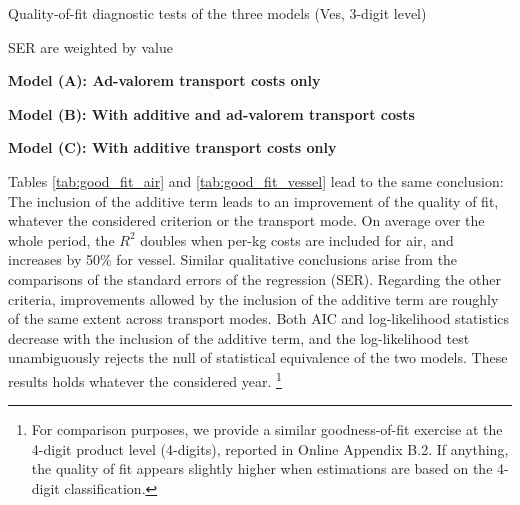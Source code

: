 \documentclass[a4paper,11pt]{article}
\begin{document}
\begin{table}[htbp]
	\centering
	\footnotesize{
		\caption{Quality-of-fit diagnostic tests of the three models (Ves, 3-digit level)}\vspace{5mm}
		\label{tab:good_fit_vessel}%
		
		\begin{tablenotes}
			\tiny
			\item SER are weighted by value
			\item \textbf{Model (A): Ad-valorem transport costs only}
			\item \textbf{Model (B): With additive and ad-valorem transport costs}
			\item \textbf{Model (C): With additive transport costs only}
\end{tablenotes}
}
\end{table}%


Tables \ref{tab:good_fit_air} and \ref{tab:good_fit_vessel} lead to the same conclusion: The inclusion of the additive term leads to an improvement of the quality of fit, whatever the considered criterion or the transport mode.
On average over the whole period, the $R^{2}$ doubles when per-kg costs are included for air, and increases by 50\% for vessel.
Similar qualitative conclusions arise from the comparisons of the standard errors of the regression (SER).
Regarding the other criteria, improvements allowed by the inclusion of the additive term are roughly of the same extent across transport modes.
Both AIC and log-likelihood statistics decrease with the inclusion of the additive term, and the log-likelihood test unambiguously rejects the null of statistical equivalence of the two models.
These results holds whatever the considered year. \footnote{For comparison purposes, we provide a similar goodness-of-fit exercise at the 4-digit product level (4-digits), reported in Online Appendix B.2. If anything, the quality of fit appears slightly higher when estimations are based on the 4-digit classification.}
\end{document}
